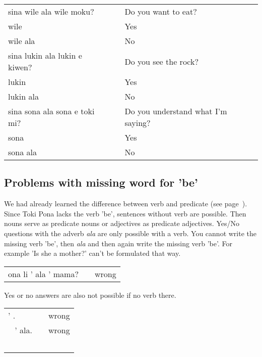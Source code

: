 \begin{supertabular}{p{5,5cm}|ll}
sina wile ala wile moku? && Do you want to eat? \\ 
wile && Yes \\ %
wile ala && No \\ %
sina lukin ala lukin e kiwen? && Do you see the rock? \\ 
lukin && Yes \\ %
lukin ala && No \\ %
sina sona ala sona e toki mi? && Do you understand what I'm saying? \\ 
sona && Yes \\ %
sona ala && No \\ %
\end{supertabular}  


% 
\subsection*{Problems with missing word for 'be'}

We had already learned the difference between verb and predicate (see page~\pageref{'predicate'}). 
Since Toki Pona lacks the verb 'be', sentences without verb are possible. 
Then nouns serve as predicate nouns or adjectives as predicate adjectives. 
Yes/No questions with the adverb \textit{ala} are only possible with a verb. 
You cannot write the missing verb 'be', then \textit{ala} and then again write the missing verb 'be'.
For example 'Is she a mother?' can't be formulated that way. 

\begin{supertabular}{p{5,5cm}|ll}
ona li ' ala ' mama? && wrong \\ %
\end{supertabular} 

Yes or no answers are also not possible if no verb there. 

\begin{supertabular}{p{5,5cm}|ll}
' . && wrong \\\ %
' ala. && wrong \\\ %
\end{supertabular} 

